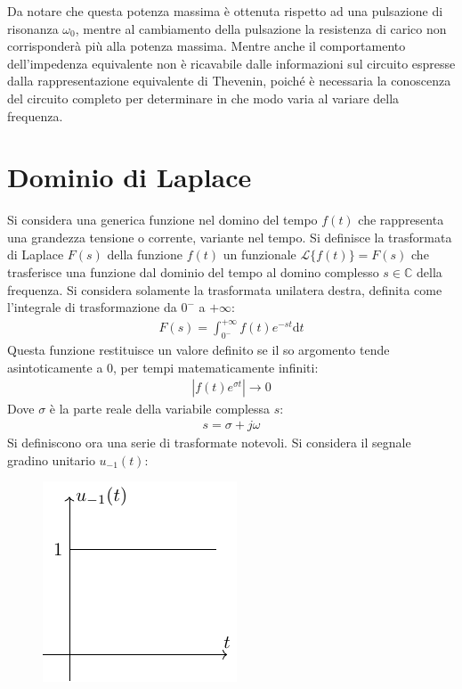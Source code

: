 \documentclass{article}
\newcommand{\df}{\mathrm{d}}
\numberwithin{equation}{subsection}
\begin{document}
Da notare che questa potenza massima è ottenuta rispetto ad una pulsazione di risonanza $\omega_0$, mentre al cambiamento della pulsazione la resistenza di carico non corrisponderà 
più alla potenza massima. Mentre anche il comportamento dell'impedenza equivalente non è ricavabile dalle informazioni sul circuito espresse dalla rappresentazione equivalente 
di Thevenin, poiché è necessaria la conoscenza del circuito completo per determinare in che modo varia al variare della frequenza. 

\clearpage

\section{Dominio di Laplace}

Si considera una generica funzione nel domino del tempo $f(t)$ che rappresenta una grandezza tensione o corrente, variante nel tempo. 
Si definisce la trasformata di Laplace $F(s)$ della funzione $f(t)$ un funzionale $\mathcal{L}\{f(t)\}=F(s)$ che trasferisce una funzione dal dominio del tempo al domino 
complesso $s\in\mathbb{C}$ della frequenza. Si considera solamente la trasformata unilatera destra, definita come l'integrale di trasformazione da $0^-$ a $+\infty$:
\begin{gather}
    F(s)=\displaystyle\int_{0^-}^{+\infty}f(t)e^{-st}\df t
\end{gather}
Questa funzione restituisce un valore definito se il so argomento tende asintoticamente a $0$, per tempi matematicamente infiniti:
\begin{gather*}
    |f(t)e^{\sigma t}|\to0
\end{gather*}
Dove $\sigma$ è la parte reale della variabile complessa $s$:
\begin{gather*}
    s=\sigma+j\omega
\end{gather*}
Si definiscono ora una serie di trasformate notevoli. Si considera il segnale gradino unitario $u_{-1}(t)$:
\begin{figure}[H]%
    \centering
    \includegraphics{gradino-unitario.pdf}%
    \label{fig:gradino-unitario}
\end{figure}
\end{document}
